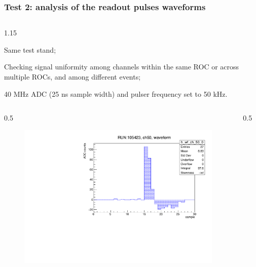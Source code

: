 \documentclass{beamer}
\begin{document}
\begin{frame}
    \frametitle{Test 2: analysis of the readout pulses waveforms}
    \vspace{-3mm}
    \begin{columns}
\begin{column}{1.15\framewidth}
    \setlength{\leftmargini}{1.2em}
 \begin{itemize}
 {\small
 \item Same test stand;
  \item Checking signal uniformity among channels within the same ROC or across multiple ROCs, and among different events;
  \item 40 MHz ADC (25 ns sample width) and pulser frequency set to 50 kHz.}
  \end{itemize}
    \end{column}
    \end{columns}
    \vspace{-2mm}
    \begin{columns}
\begin{column}{0.5\framewidth}
         \begin{figure}[!h]
      \centering
      \hspace*{-2em}
      \includegraphics[width=1.\columnwidth]{figures/pdf/wf_ch50_0.pdf}
     \label{fig:normalhits}
\end{figure}
\end{column}
\begin{column}{0.5\framewidth}
      \begin{figure}[!h]
      \centering
            \hspace*{-1em}

\end{figure}
\end{column}
\end{columns}
\end{frame}
\end{document}

